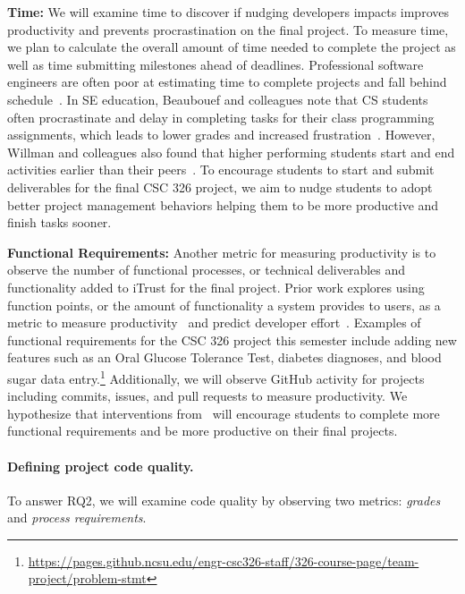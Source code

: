 \textbf{Time:} We will examine time to discover if nudging developers impacts improves productivity and prevents procrastination on the final project. To measure time, we plan to calculate the overall amount of time needed to complete the project as well as time submitting milestones ahead of deadlines. Professional software engineers are often poor at estimating time to complete projects and fall behind schedule~\cite{charette2005software}. In SE education, Beaubouef and colleagues note that CS students often procrastinate and delay in completing tasks for their class programming assignments, which leads to lower grades and increased frustration~\cite{beaubouef2005high}. However, Willman and colleagues also found that higher performing students start and end activities earlier than their peers~\cite{willman2015study}. To encourage students to start and submit deliverables for the final CSC 326 project, we aim to nudge students to adopt better project management behaviors helping them to be more productive and finish tasks sooner.

\textbf{Functional Requirements:} Another metric for measuring productivity is to observe the number of functional processes, or technical deliverables and functionality added to iTrust for the final project. Prior work explores using function points, or the amount of functionality a system provides to users, as a metric to measure productivity~\cite{bok2000software} and predict developer effort~\cite{matson1994software}. Examples of functional requirements for the CSC 326 project this semester include adding new features such as an Oral Glucose Tolerance Test, diabetes diagnoses, and blood sugar data entry.\footnote{\url{https://pages.github.ncsu.edu/engr-csc326-staff/326-course-page/team-project/problem-stmt}} Additionally, we will observe GitHub activity for projects including commits, issues, and pull requests to measure productivity. We hypothesize that interventions from \TOOL~will encourage students to complete more functional requirements and be more productive on their final projects.

\paragraph{Defining project code quality.}

To answer RQ2, we will examine code quality by observing two metrics: \textit{grades} and \textit{process requirements}.

